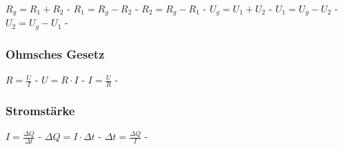 $ R_{g}  = R_{1}  + R_{2} $ - $ R_{1}  = R_{g}  - R_{2} $ - $ R_{2}  = R_{g}  - R_{1} $ - $ U_{g}  = U_{1}  + U_{2} $ - $ U_{1}  = U_{g}  - U_{2} $ - $ U_{2}  = U_{g}  - U_{1} $ - \\ 
 
\subsubsection{Ohmsches Gesetz} 
\begin{minipage}{0.45\textwidth} 
\end{minipage} 
\begin{minipage}{0.45\textwidth} 
 
\legende{}\end{minipage} 
 
$ R = \frac{U}{I} $ - $ U = R\cdot I $ - $ I = \frac{U}{R} $ - \\ 
 
\subsubsection{Stromstärke} 
\begin{minipage}{0.45\textwidth} 
\end{minipage} 
\begin{minipage}{0.45\textwidth} 
 
\legende{}\end{minipage} 
 
$ I = \frac{\Delta Q}{\Delta t} $ - $ \Delta Q =I\cdot \Delta t $ - $ \Delta t = \frac{\Delta Q}{I} $ - \\ 
 
